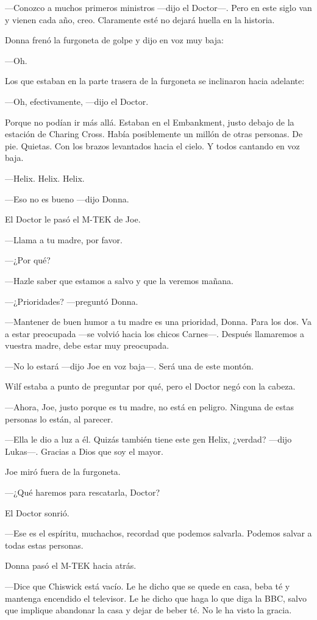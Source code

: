 ---Conozco a muchos primeros ministros ---dijo el Doctor---. Pero en
este siglo van y vienen cada año, creo. Claramente esté no dejará huella
en la historia.

Donna frenó la furgoneta de golpe y dijo en voz muy baja:~

---Oh.

Los que estaban en la parte trasera de la furgoneta se inclinaron hacia
adelante:

---Oh, efectivamente, ---dijo el Doctor.

Porque no podían ir más allá. Estaban en el Embankment, justo debajo de
la estación de Charing Cross. Había posiblemente un millón de otras
personas. De pie. Quietas. Con los brazos levantados hacia el cielo. Y
todos cantando en voz baja.

---Helix. Helix. Helix.

---Eso no es bueno ---dijo Donna.

El Doctor le pasó el M-TEK de Joe.

---Llama a tu madre, por favor.

---¿Por qué?

---Hazle saber que estamos a salvo y que la veremos mañana.

---¿Prioridades? ---preguntó Donna.

---Mantener de buen humor a tu madre es una prioridad, Donna. Para los
dos. Va a estar preocupada ---se volvió hacia los chicos Carnes---.
Después llamaremos a vuestra madre, debe estar muy preocupada.

---No lo estará ---dijo Joe en voz baja---. Será una de este montón.

Wilf estaba a punto de preguntar por qué, pero el Doctor negó con la
cabeza.

---Ahora, Joe, justo porque es tu madre, no está en peligro. Ninguna de
estas personas lo están, al parecer.

---Ella le dio a luz a él. Quizás también tiene este gen Helix, ¿verdad?
---dijo Lukas---. Gracias a Dios que soy el mayor.

Joe miró fuera de la furgoneta.

---¿Qué haremos para rescatarla, Doctor?

El Doctor sonrió.

---Ese es el espíritu, muchachos, recordad que podemos salvarla. Podemos
salvar a todas estas personas.

Donna pasó el M-TEK hacia atrás.

---Dice que Chiswick está vacío. Le he dicho que se quede en casa, beba
té y mantenga encendido el televisor. Le he dicho que haga lo que diga
la BBC, salvo que implique abandonar la casa y dejar de beber té. No le
ha visto la gracia.

